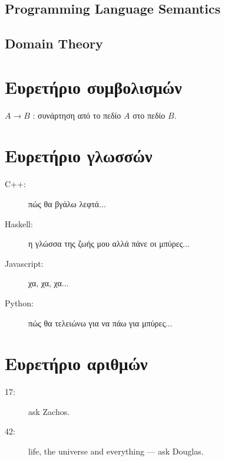 \documentclass[diploma]{softlab-thesis}
\begin{document}
\section{Programming Language Semantics}

\section{Domain Theory}




\nocite{*}






\backmatter

\appendix

\chapter{Ευρετήριο συμβολισμών}

$A \rightarrow B$ : συνάρτηση από το πεδίο $A$ στο πεδίο $B$.

\chapter{Ευρετήριο γλωσσών}

\begin{description}
\item[C++:] πώς θα βγάλω λεφτά...
\item[Haskell:] η γλώσσα της ζωής μου αλλά πάνε οι μπύρες...
\item[Javascript:] χα, χα, χα...
\item[Python:] πώς θα τελειώνω για να πάω για μπύρες...
\end{description}


\chapter{Ευρετήριο αριθμών}

\begin{description}
\item[17:] ask Zachos.
\item[42:] life, the universe and everything --- ask Douglas.
\end{description}


\end{document}
